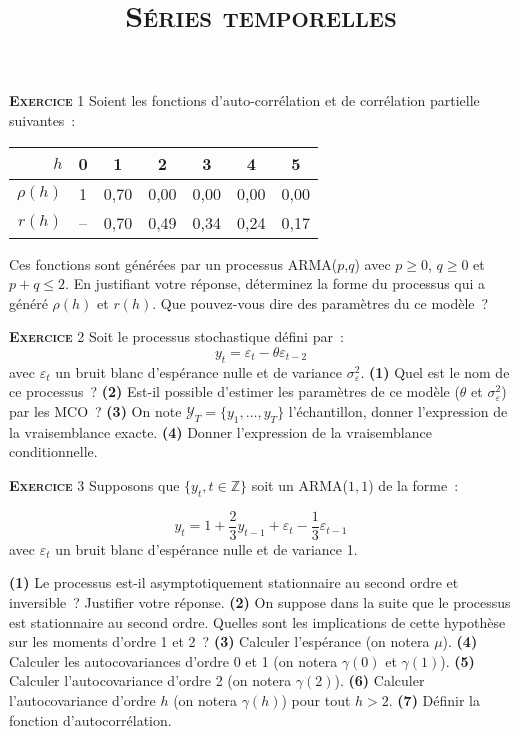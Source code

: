 \documentclass[10pt,a4paper,notitlepage,twocolumn]{article}
\newcommand{\exercice}[1]{\textsc{\textbf{Exercice}} #1}
\newcommand{\question}[1]{\textbf{(#1)}}
\begin{document}
\title{\textsc{Séries temporelles}}
\author{}
\date{}

\maketitle

\exercice{1} Soient les fonctions d'auto-corrélation et de corrélation
partielle suivantes~:
\begin{table}[H]
  \centering
  \begin{tabular}{r|cccccc}
    \hline\hline
    $h$ & 0 & 1 & 2 & 3 & 4 & 5 \\\hline
    $\rho (h)$ & 1 & 0,70 & 0,00 & 0,00 & 0,00 & 0,00\\
    $r (h)$ & -- & 0,70 & 0,49 & 0,34 & 0,24 & 0,17\\
    \hline\hline
  \end{tabular}
\end{table}
\noindent Ces  fonctions sont générées par  un processus ARMA($p$,$q$)
avec $p\geq 0$, $q\geq 0$ et $p+q \leq 2$. En
justifiant  votre réponse,  déterminez  la forme  du  processus qui  a
généré $\rho(h)$ et $r(h)$. Que pouvez-vous dire des paramètres du ce
modèle~?

\bigskip
\bigskip


\exercice{2} Soit le processus stochastique défini par~:
\[
  y_t = \varepsilon_t - \theta \varepsilon_{t-2}
\]
avec $\varepsilon_t$ un bruit blanc d'espérance nulle et de variance
$\sigma_{\varepsilon}^2$. \textbf{(1)} Quel est le nom de ce
processus~? \textbf{(2)} Est-il possible d'estimer les paramètres de
ce modèle ($\theta$ et $\sigma_{\varepsilon}^2$) par les MCO~?
\textbf{(3)} On note $\mathcal Y_T = \{y_1,\dots,y_T\}$ l'échantillon,
donner l'expression de la vraisemblance exacte. \textbf{(4)} Donner
l'expression de la vraisemblance conditionnelle.

\bigskip
\bigskip

\exercice{3} Supposons que $\{y_t,t\in\mathbb Z\}$ soit un ARMA($1,1$) de la forme :

\[
y_t = 1 + \frac{2}{3}y_{t-1} + \varepsilon_t - \frac{1}{3} \varepsilon_{t-1}
\]
avec $\varepsilon_t$ un bruit blanc d'espérance nulle et de variance 1.\newline

\question{1} Le processus est-il asymptotiquement stationnaire au second ordre
et inversible~? Justifier votre réponse. \question{2} On suppose dans la suite
que le processus est stationnaire au second ordre. Quelles sont les implications
de cette hypothèse sur les moments d'ordre 1 et 2~? \question{3} Calculer
l'espérance (on notera $\mu$). \question{4} Calculer les autocovariances d'ordre
0 et 1 (on notera $\gamma(0)$ et $\gamma(1)$). \question{5} Calculer
l'autocovariance d'ordre 2 (on notera $\gamma(2)$). \question{6} Calculer
l'autocovariance d'ordre $h$ (on notera $\gamma(h)$) pour tout $h>2$.
\question{7} Définir la fonction d'autocorrélation.
\end{document}
